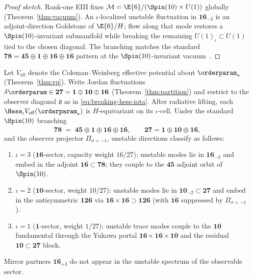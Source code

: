 \begin{proof}[Proof sketch]
Rank-one EIII fixes $\mathcal{M}=\E{6}/(\Spin(10)\times U(1))$ globally
(Theorem~\ref{thm:vacuum}). An $\iota$-localized unstable fluctuation in
$\mathbf{16}_{-3}$ is an adjoint-direction Goldstone of $\E{6}/H$; flow along
that mode restores a $\Spin(10)$-invariant submanifold while breaking the
remaining $U(1)_\iota\subset U(1)$ tied to the chosen diagonal. The branching
matches the standard
$\mathbf{78}=\mathbf{45}\oplus\mathbf{1}\oplus\mathbf{16}\oplus\overline{\mathbf{16}}$
pattern at the $\Spin(10)$-invariant vacuum~\cite{Witten1985,GeorgiGlashow1974}.
\end{proof}

\begin{lemma}
\label{lem:breaking-hess-spin10}
Let $V_{\mathrm{eff}}$ denote the Coleman--Weinberg effective potential about
$\orderparam_\star$ (Theorem~\ref{thm:rp}). Write Jordan fluctuations
$\delta\orderparam\in\mathbf{27}=\mathbf{1}\oplus\mathbf{10}\oplus\mathbf{16}$
(Theorem~\ref{thm:partition}) and restrict to the observer diagonal
$\mathfrak{d}$ as in \eqref{eq:breaking-hess-iota}. After radiative lifting,
each $\Hess_\iota V_{\mathrm{eff}}(\orderparam_\star)$ is
$H$-equivariant on its $\iota$-cell. Under the standard $\Spin(10)$ branching
\begin{equation}\label{eq:breaking-adjoint-branch}
  \mathbf{78}
  \;=\;
  \mathbf{45}\oplus\mathbf{1}\oplus\mathbf{16}\oplus\overline{\mathbf{16}},
  \qquad
  \mathbf{27}=\mathbf{1}\oplus\mathbf{10}\oplus\mathbf{16},
\end{equation}
and the observer projector $\Pi_{\sigma=-1}$, unstable directions classify as
follows:
\begin{enumerate}[label=(\roman*),leftmargin=*]
  \item $\iota=3$ ($\mathbf{16}$-sector, capacity weight $16/27$): unstable
    modes lie in $\mathbf{16}_{-3}$ and embed in the adjoint
    $\mathbf{16}\subset\mathbf{78}$; they couple to the $\mathbf{45}$ adjoint
    orbit of $\Spin(10)$.
  \item $\iota=2$ ($\mathbf{10}$-sector, weight $10/27$): unstable modes lie in
    $\mathbf{10}_{-2}\subset\mathbf{27}$ and embed in the antisymmetric
    $\mathbf{126}$ via $\mathbf{16}\times\mathbf{16}\supset\mathbf{126}$
    (with $\overline{\mathbf{16}}$ suppressed by $\Pi_{\sigma=-1}$).
  \item $\iota=1$ ($\mathbf{1}$-sector, weight $1/27$): unstable trace modes
    couple to the $\mathbf{10}$ fundamental through the Yukawa portal
    $\mathbf{16}\times\mathbf{16}\times\mathbf{10}$ and the residual
    $\mathbf{10}\subset\mathbf{27}$ block.
\end{enumerate}
Mirror partners $\overline{\mathbf{16}}_{+3}$ do not appear in the unstable
spectrum of the observable sector.
\end{lemma}

